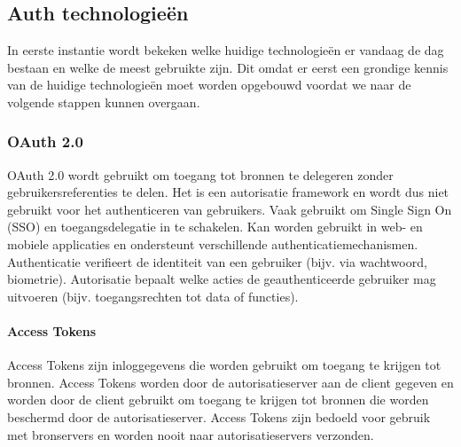 \chapter{}%
\label{ch:stand-van-zaken}



\section{Auth technologieën}%
\label{sec:auth-technologieën}
In eerste instantie wordt bekeken welke huidige technologieën er vandaag de dag bestaan en welke de meest gebruikte zijn. Dit omdat er eerst een
grondige kennis van de huidige technologieën moet worden opgebouwd voordat we naar de volgende stappen kunnen overgaan.


\subsection{OAuth 2.0}%
\label{subsec:oauth-2.0}
\autocite{Hardt2012}
OAuth 2.0 wordt gebruikt om toegang tot bronnen te delegeren zonder gebruikersreferenties te delen. Het is een autorisatie framework en wordt dus niet
gebruikt voor het authenticeren van gebruikers. Vaak gebruikt om Single Sign On (SSO) en toegangsdelegatie in te schakelen. Kan worden gebruikt in web-
en mobiele applicaties en ondersteunt verschillende authenticatiemechanismen.
Authenticatie verifieert de identiteit van een gebruiker (bijv. via wachtwoord, biometrie).
Autorisatie bepaalt welke acties de geauthenticeerde gebruiker mag uitvoeren (bijv. toegangsrechten tot data of functies).

\subsubsection{Access Tokens}%
\label{subsubsec:access-tokens}
Access Tokens zijn inloggegevens die worden gebruikt om toegang te krijgen tot bronnen. Access Tokens worden door de autorisatieserver aan de client
gegeven en worden door de client gebruikt om toegang te krijgen tot bronnen die worden beschermd door de autorisatieserver. Access Tokens zijn bedoeld
voor gebruik met bronservers en worden nooit naar autorisatieservers verzonden.


